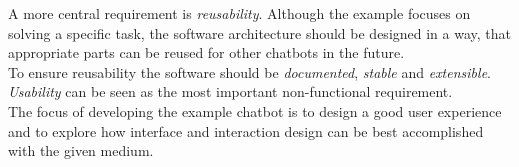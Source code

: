 A more central requirement is \emph{reusability}.
Although the example focuses on solving a specific task,
the software architecture should be designed in a way,
that appropriate parts can be reused for other chatbots in the future.
\\
To ensure reusability the software should be \emph{documented}, \emph{stable} and \emph{extensible}.
\\

\emph{Usability} can be seen as the most important non-functional requirement.
\\
The focus of developing the example chatbot is to design a good user experience and to explore how interface and interaction design can be best accomplished with the given medium.
